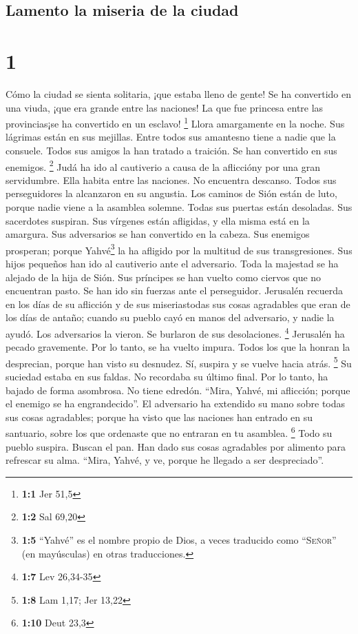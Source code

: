 \hypertarget{lamento-la-miseria-de-la-ciudad}{%
\subsection{Lamento la miseria de la
ciudad}\label{lamento-la-miseria-de-la-ciudad}}

\hypertarget{section}{%
\section{1}\label{section}}

 Cómo la ciudad se sienta solitaria, ¡que estaba lleno de
gente! Se ha convertido en una viuda, ¡que era grande entre las
naciones! La que fue princesa entre las provincias¡se ha convertido en
un esclavo! \footnote{\textbf{1:1} Jer 51,5}  Llora
amargamente en la noche. Sus lágrimas están en sus mejillas. Entre todos
sus amantesno tiene a nadie que la consuele. Todos sus amigos la han
tratado a traición. Se han convertido en sus enemigos. \footnote{\textbf{1:2}
  Sal 69,20}  Judá ha ido al cautiverio a causa de la
afliccióny por una gran servidumbre. Ella habita entre las naciones. No
encuentra descanso. Todos sus perseguidores la alcanzaron en su
angustia.  Los caminos de Sión están de luto, porque nadie
viene a la asamblea solemne. Todas sus puertas están desoladas. Sus
sacerdotes suspiran. Sus vírgenes están afligidas, y ella misma está en
la amargura.  Sus adversarios se han convertido en la
cabeza. Sus enemigos prosperan; porque Yahvé\footnote{\textbf{1:5}
  ``Yahvé'' es el nombre propio de Dios, a veces traducido como
  ``\textsc{Señor}'' (en mayúsculas) en otras traducciones.} la ha
afligido por la multitud de sus transgresiones. Sus hijos pequeños han
ido al cautiverio ante el adversario.  Toda la majestad se
ha alejado de la hija de Sión. Sus príncipes se han vuelto como ciervos
que no encuentran pasto. Se han ido sin fuerzas ante el perseguidor.
 Jerusalén recuerda en los días de su aflicción y de sus
miseriastodas sus cosas agradables que eran de los días de antaño;
cuando su pueblo cayó en manos del adversario, y nadie la ayudó. Los
adversarios la vieron. Se burlaron de sus desolaciones. \footnote{\textbf{1:7}
  Lev 26,34-35}  Jerusalén ha pecado gravemente. Por lo
tanto, se ha vuelto impura. Todos los que la honran la desprecian,
porque han visto su desnudez. Sí, suspira y se vuelve hacia atrás.
\footnote{\textbf{1:8} Lam 1,17; Jer 13,22}  Su suciedad
estaba en sus faldas. No recordaba su último final. Por lo tanto, ha
bajado de forma asombrosa. No tiene edredón. ``Mira, Yahvé, mi
aflicción; porque el enemigo se ha engrandecido''.  El
adversario ha extendido su mano sobre todas sus cosas agradables; porque
ha visto que las naciones han entrado en su santuario, sobre los que
ordenaste que no entraran en tu asamblea. \footnote{\textbf{1:10} Deut
  23,3}  Todo su pueblo suspira. Buscan el pan. Han dado
sus cosas agradables por alimento para refrescar su alma. ``Mira, Yahvé,
y ve, porque he llegado a ser despreciado''.

